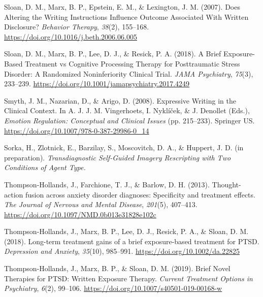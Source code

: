 \documentclass[
  man,floatsintext]{apa7}
\newlength{\cslhangindent}
\newlength{\cslentryspacingunit} %
\newenvironment{CSLReferences}[2] %
 {%
  \setlength{\parindent}{0pt}
  \ifodd #1
  \let\oldpar\par
  \def\par{\hangindent=\cslhangindent\oldpar}
  \fi
  \setlength{\parskip}{#2\cslentryspacingunit}
 }%
 {}
\begin{document}
\begin{CSLReferences}{1}{0}
\leavevmode{}%
Sloan, D. M., Marx, B. P., Epstein, E. M., \& Lexington, J. M. (2007). Does Altering the Writing Instructions Influence Outcome Associated With Written Disclosure? \emph{Behavior Therapy}, \emph{38}(2), 155--168. \url{https://doi.org/10.1016/j.beth.2006.06.005}

\leavevmode{}%
Sloan, D. M., Marx, B. P., Lee, D. J., \& Resick, P. A. (2018). A Brief Exposure-Based Treatment vs Cognitive Processing Therapy for Posttraumatic Stress Disorder: A Randomized Noninferiority Clinical Trial. \emph{JAMA Psychiatry}, \emph{75}(3), 233--239. \url{https://doi.org/10.1001/jamapsychiatry.2017.4249}

\leavevmode{}%
Smyth, J. M., Nazarian, D., \& Arigo, D. (2008). Expressive Writing in the Clinical Context. In A. J. J. M. Vingerhoets, I. Nyklíček, \& J. Denollet (Eds.), \emph{Emotion Regulation: Conceptual and Clinical Issues} (pp. 215--233). Springer US. \url{https://doi.org/10.1007/978-0-387-29986-0_14}

\leavevmode{}%
Sorka, H., Zlotnick, E., Barzilay, S., Moscovitch, D. A., \& Huppert, J. D. (in preparation). \emph{Transdiagnostic Self-Guided Imagery Rescripting with Two Conditions of Agent Type.}

\leavevmode{}%
Thompson-Hollands, J., Farchione, T. J., \& Barlow, D. H. (2013). Thought-action fusion across anxiety disorder diagnoses: Specificity and treatment effects. \emph{The Journal of Nervous and Mental Disease}, \emph{201}(5), 407--413. \url{https://doi.org/10.1097/NMD.0b013e31828e102c}

\leavevmode{}%
Thompson-Hollands, J., Marx, B. P., Lee, D. J., Resick, P. A., \& Sloan, D. M. (2018). Long-term treatment gains of a brief exposure-based treatment for PTSD. \emph{Depression and Anxiety}, \emph{35}(10), 985--991. \url{https://doi.org/10.1002/da.22825}

\leavevmode{}%
Thompson-Hollands, J., Marx, B. P., \& Sloan, D. M. (2019). Brief Novel Therapies for PTSD: Written Exposure Therapy. \emph{Current Treatment Options in Psychiatry}, \emph{6}(2), 99--106. \url{https://doi.org/10.1007/s40501-019-00168-w}


\end{CSLReferences}
\end{document}
